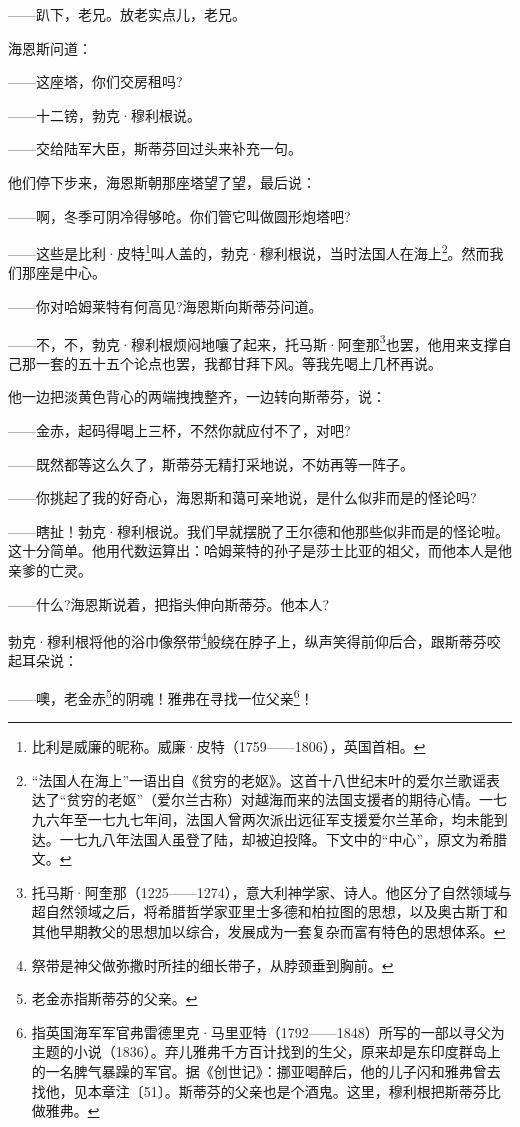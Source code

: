 \par ——趴下，老兄。放老实点儿，老兄。
\par 海恩斯问道：
\par ——这座塔，你们交房租吗?
\par ——十二镑，勃克·穆利根说。
\par ——交给陆军大臣，斯蒂芬回过头来补充一句。
\par 他们停下步来，海恩斯朝那座塔望了望，最后说：
\par ——啊，冬季可阴冷得够呛。你们管它叫做圆形炮塔吧?
\par ——这些是比利·皮特\footnote{比利是威廉的昵称。威廉·皮特（1759——1806），英国首相。}叫人盖的，勃克·穆利根说，当时法国人在海上\footnote{“法国人在海上”一语出自《贫穷的老妪》。这首十八世纪末叶的爱尔兰歌谣表达了“贫穷的老妪”（爱尔兰古称）对越海而来的法国支援者的期待心情。一七九六年至一七九七年间，法国人曾两次派出远征军支援爱尔兰革命，均未能到达。一七九八年法国人虽登了陆，却被迫投降。下文中的“中心”，原文为希腊文。}。然而我们那座是中心。
\par ——你对哈姆莱特有何高见?海恩斯向斯蒂芬问道。
\par ——不，不，勃克·穆利根烦闷地嚷了起来，托马斯·阿奎那\footnote{托马斯·阿奎那（1225——1274），意大利神学家、诗人。他区分了自然领域与超自然领域之后，将希腊哲学家亚里士多德和柏拉图的思想，以及奥古斯丁和其他早期教父的思想加以综合，发展成为一套复杂而富有特色的思想体系。}也罢，他用来支撑自己那一套的五十五个论点也罢，我都甘拜下风。等我先喝上几杯再说。
\par 他一边把淡黄色背心的两端拽拽整齐，一边转向斯蒂芬，说：
\par ——金赤，起码得喝上三杯，不然你就应付不了，对吧?
\par ——既然都等这么久了，斯蒂芬无精打采地说，不妨再等一阵子。
\par ——你挑起了我的好奇心，海恩斯和蔼可亲地说，是什么似非而是的怪论吗?
\par ——瞎扯！勃克·穆利根说。我们早就摆脱了王尔德和他那些似非而是的怪论啦。这十分简单。他用代数运算出：哈姆莱特的孙子是莎士比亚的祖父，而他本人是他亲爹的亡灵。
\par ——什么?海恩斯说着，把指头伸向斯蒂芬。他本人?
\par 勃克·穆利根将他的浴巾像祭带\footnote{祭带是神父做弥撒时所挂的细长带子，从脖颈垂到胸前。}般绕在脖子上，纵声笑得前仰后合，跟斯蒂芬咬起耳朵说：
\par ——噢，老金赤\footnote{老金赤指斯蒂芬的父亲。}的阴魂！雅弗在寻找一位父亲\footnote{指英国海军军官弗雷德里克·马里亚特（1792——1848）所写的一部以寻父为主题的小说（1836）。弃儿雅弗千方百计找到的生父，原来却是东印度群岛上的一名脾气暴躁的军官。据《创世记》：挪亚喝醉后，他的儿子闪和雅弗曾去找他，见本章注〔51〕。斯蒂芬的父亲也是个酒鬼。这里，穆利根把斯蒂芬比做雅弗。}！
